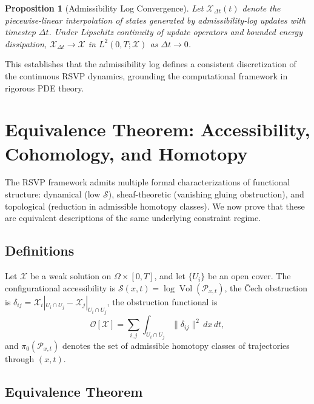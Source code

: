 \documentclass[11pt, a4paper, twocolumn]{article}
\newtheorem{proposition}[definition]{Proposition}
\newcommand{\X}{\mathcal{X}}
\newcommand{\Sfield}{\mathcal{S}}
\begin{document}
\begin{proposition}[Admissibility Log Convergence]
Let $\X_{\Delta t}(t)$ denote the piecewise-linear interpolation of states
generated by admissibility-log updates with timestep $\Delta t$. Under
Lipschitz continuity of update operators and bounded energy dissipation,
$\X_{\Delta t} \to \X$ in $L^2(0,T;\mathcal{X})$ as $\Delta t \to 0$.
\end{proposition}

This establishes that the admissibility log defines a consistent discretization
of the continuous RSVP dynamics, grounding the computational framework in
rigorous PDE theory.

\section{Equivalence Theorem: Accessibility, Cohomology, and Homotopy}

The RSVP framework admits multiple formal characterizations of functional
structure: dynamical (low $\Sfield$), sheaf-theoretic (vanishing gluing
obstruction), and topological (reduction in admissible homotopy classes). We
now prove that these are equivalent descriptions of the same underlying
constraint regime.

\subsection{Definitions}

Let $\X$ be a weak solution on $\Omega \times [0,T]$, and let $\{U_i\}$ be an
open cover. The configurational accessibility is
$\Sfield(x,t) = \log\operatorname{Vol}(\mathcal{P}_{x,t})$, the \v{C}ech
obstruction is
$\delta_{ij} = \X_i|_{U_i \cap U_j} - \X_j|_{U_i \cap U_j}$,
the obstruction functional is
\[
    \mathcal{O}[\X] = \sum_{i,j}\int_{U_i\cap U_j}\|\delta_{ij}\|^2\,dx\,dt,
\]
and $\pi_0(\mathcal{P}_{x,t})$ denotes the set of admissible homotopy classes
of trajectories through $(x,t)$.

\subsection{Equivalence Theorem}
\end{document}
